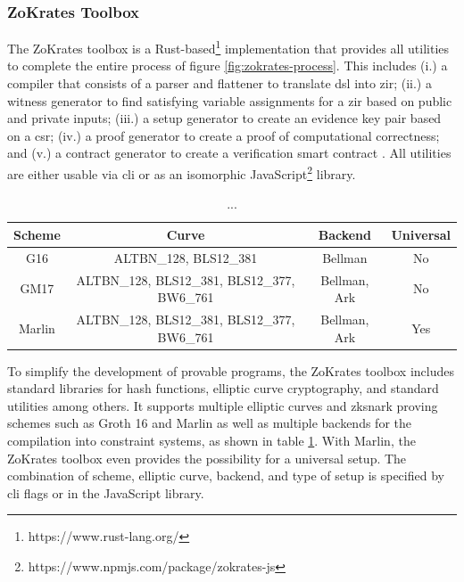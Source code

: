 
\subsubsection{ZoKrates Toolbox}
\label{subsubsec:toolbox}

The ZoKrates toolbox is a Rust-based\footnote{https://www.rust-lang.org/} implementation that provides all utilities to complete the entire process of figure \ref{fig:zokrates-process}. This includes (i.) a compiler that consists of a parser and flattener to translate \acrshort{dsl} into \acrshort{zir}; (ii.) a witness generator to find satisfying variable assignments for a \acrshort{zir} based on public and private inputs; (iii.) a setup generator to create an evidence key pair based on a \acrshort{csr}; (iv.) a proof generator to create a proof of computational correctness; and (v.) a contract generator to create a verification smart contract \cite{eberhardtZoKratesScalablePrivacyPreserving2018a}. All utilities are either usable via \acrfull{cli} or as an isomorphic JavaScript\footnote{https://www.npmjs.com/package/zokrates-js} library.

\begin{table}[h]
  \small
  \centering
    \begin{tabular}{cccc}
    \toprule
    \textbf{Scheme} & \textbf{Curve} & \textbf{Backend} & \textbf{Universal} \\
    \midrule
    G16 \cite{grothSizePairingBasedNoninteractive2016} & ALTBN\_128, BLS12\_381 & Bellman & No \\
    GM17 \cite{grothSnarkySignaturesMinimal2017} & ALTBN\_128, BLS12\_381, BLS12\_377, BW6\_761 & Bellman, Ark & No \\
    Marlin \cite{chiesaMarlinPreprocessingZkSNARKs2020} & ALTBN\_128, BLS12\_381, BLS12\_377, BW6\_761 & Bellman, Ark & Yes \\
    \bottomrule
    \end{tabular}%
  \caption{...}
  \label{tab:zokrates-backend}%
\end{table}%

To simplify the development of provable programs, the ZoKrates toolbox includes standard libraries for hash functions, elliptic curve cryptography, and standard utilities among others. It supports multiple elliptic curves and \acrshort{zksnark} proving schemes such as Groth 16 and Marlin as well as multiple backends for the compilation into constraint systems, as shown in table \ref{tab:zokrates-backend}. With Marlin, the ZoKrates toolbox even provides the possibility for a universal setup. The combination of scheme, elliptic curve, backend, and type of setup is specified by \acrshort{cli} flags or in the JavaScript library.